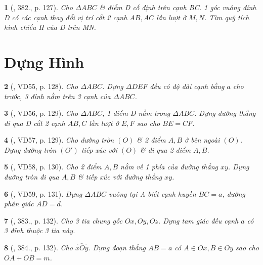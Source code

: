 \documentclass{article}
\newtheorem{baitoan}{}
\begin{document}
\begin{baitoan}[\cite{Binh_Toan_9_tap_2}, 382., p. 127]
	Cho $\Delta ABC$ \& điểm D cố định trên cạnh BC. 1 góc vuông đỉnh D có các cạnh thay đổi vị trí cắt 2 cạnh $AB,AC$ lần lượt ở $M,N$. Tìm quỹ tích hình chiếu H của D trên MN.
\end{baitoan}


\section{Dựng Hình}

\begin{baitoan}[\cite{Binh_Toan_9_tap_2}, VD55, p. 128]
	Cho $\Delta ABC$. Dựng $\Delta DEF$ đều có độ dài cạnh bằng $a$ cho trước, 3 đỉnh nằm trên 3 cạnh của $\Delta ABC$.
\end{baitoan}

\begin{baitoan}[\cite{Binh_Toan_9_tap_2}, VD56, p. 129]
	Cho $\Delta ABC$, 1 điểm D nằm trong $\Delta ABC$. Dựng đường thẳng đi qua D cắt 2 cạnh $AB,C$ lần lượt ở $E,F$ sao cho $BE = CF$.
\end{baitoan}

\begin{baitoan}[\cite{Binh_Toan_9_tap_2}, VD57, p. 129]
	Cho đường tròn $(O)$ \& 2 điểm $A,B$ ở bên ngoài $(O)$. Dựng đường tròn $(O')$ tiếp xúc với $(O)$ \& đi qua 2 điểm $A,B$.
\end{baitoan}

\begin{baitoan}[\cite{Binh_Toan_9_tap_2}, VD58, p. 130]
	Cho 2 điểm $A,B$ nằm về 1 phía của đường thẳng $xy$. Dựng đường tròn đi qua $A,B$ \& tiếp xúc với đường thẳng $xy$.
\end{baitoan}
\begin{baitoan}[\cite{Binh_Toan_9_tap_2}, VD59, p. 131]
	Dựng $\Delta ABC$ vuông tại A biết cạnh huyền $BC = a$, đường phân giác $AD = d$.
\end{baitoan}

\begin{baitoan}[\cite{Binh_Toan_9_tap_2}, 383., p. 132]
	Cho 3 tia chung gốc $Ox,Oy,Oz$. Dựng tam giác đều cạnh $a$ có 3 đỉnh thuộc 3 tia này.
\end{baitoan}

\begin{baitoan}[\cite{Binh_Toan_9_tap_2}, 384., p. 132]
	Cho $\widehat{xOy}$. Dựng đoạn thẳng $AB = a$ có $A\in Ox,B\in Oy$ sao cho $OA + OB = m$.
\end{baitoan}
\end{document}
